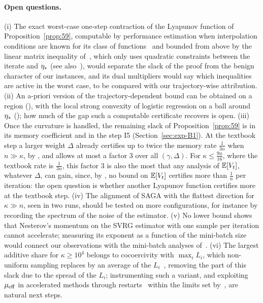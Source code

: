 \paragraph{Open questions.}
(i) The exact worst-case one-step contraction of the Lyapunov function of Proposition~\ref{prop:59}, computable by
performance estimation when interpolation conditions are known for its class of
functions~\cite{taylor2017smooth,goujaud2024pepit}
and bounded from above by the linear matrix inequality of~\cite{hu2017unified}, which only uses quadratic constraints
between the iterate and $\eta_\ast$ (see also~\cite{taylor2019stochastic}), would separate the slack of the proof from
the benign character of our instances, and its dual multipliers would say which inequalities are active in the worst
case, to be compared with our trajectory-wise attribution. (ii) An a-priori version of the trajectory-dependent bound
can be obtained on a region (), with the local strong convexity of logistic regression on a
ball around $\eta_\ast$ (); how much of the gap such a computable certificate recovers is
open. (iii) Once the curvature is handled, the remaining slack of Proposition~\ref{prop:59} is in its memory
coefficient and in the step I5 (Section~\ref{sec:exp-B1}). At the textbook step a larger weight $\Delta$ already
certifies up to twice the memory rate $\frac1{3n}$ when $n\gg\kappa$, by , and 
allows at most a factor $3$ over all $(\gamma,\Delta)$. For $\kappa\le\frac{9n}{16}$, where the textbook rate is
$\frac1{3n}$, this factor $3$ is also the most that any analysis of $\mathbb{E}[V_t]$, whatever $\Delta$, can gain, since, by
, no bound on $\mathbb{E}[V_t]$ certifies more than $\frac1n$ per iteration: the open question is
whether another Lyapunov function certifies more at the textbook step. (iv) The alignment of SAGA with the flattest
direction for
$\kappa\gg n$, seen in two runs, should be tested on more configurations, for instance by recording the spectrum of the
noise of the estimator. (v) No lower bound shows that Nesterov's momentum on the SVRG estimator with one sample per
iteration cannot accelerate; measuring its exponent as a function of the mini-batch size would connect our
observations with the mini-batch analyses of~\cite{nitanda2016accelerated,driggs2022accelerating}. (vi) The largest
additive share for $\kappa\ge10^4$ belongs to cocoercivity with $\max_iL_i$, which non-uniform sampling replaces by an
average of the $L_i$~\cite{xiao2014proximal,schmidt2015nonuniform,needell2016stochastic}, removing the part of this
slack due to the spread of the $L_i$; instrumenting such a variant, and exploiting $\mu_{\mathrm{eff}}$ in accelerated methods
through restarts~\cite{fercoq2019adaptive,roulet2020sharpness} within the limits set
by~\cite{guilleescuret2022gradient,arjevani2017limitations}, are natural next steps.
